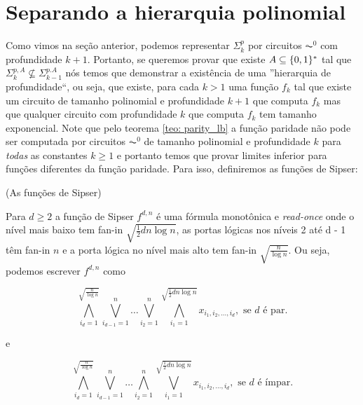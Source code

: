 \section{Separando a hierarquia polinomial}

Como vimos na seção anterior, podemos representar $\Sigma_{k}^{p}$ por circuitos $\AC^{0}$ com profundidade $k + 1$. Portanto, se queremos provar que existe $A \subseteq \{0, 1\}^{*}$ tal que $\Sigma_{k}^{p, A} \not\subseteq \Sigma_{k - 1}^{p. A}$ nós temos que demonstrar a existência de uma ''hierarquia de profundidade``, ou seja, que existe, para cada $k > 1$ uma função $f_{k}$ tal que existe um circuito de tamanho polinomial e profundidade $k + 1$ que computa $f_{k}$ mas que qualquer circuito com profundidade $k$ que computa $f_{k}$ tem tamanho exponencial. Note que pelo teorema \ref{teo: parity_lb} a função paridade não pode ser computada por circuitos $\AC^{0}$ de tamanho polinomial e profundidade $k$ para \emph{todas} as constantes $k \geq 1$ e portanto temos que provar limites inferior para funções diferentes da função paridade. Para isso, definiremos as funções de Sipser:

\begin{defi} (As funções de Sipser) \label{Sipser_f}

Para $d \geq 2$ a função de Sipser $f^{d, n}$ é uma fórmula monotônica e \emph{read-once} onde o nível mais baixo tem fan-in $\sqrt{\frac{1}{2}dn\log n}$, as portas lógicas nos níveis 2 até d - 1 têm fan-in $n$ e a porta lógica no nível mais alto tem fan-in $\sqrt{\frac{n}{\log n}}$. Ou seja, podemos escrever $f^{d, n}$ como

\begin{equation} \label{Sipser_f_def_1}
	\bigwedge_{i_{d}  = 1}^{\sqrt{\frac{n}{\log n}}}\bigvee_{i_{d - 1} = 1}^{n} \dots \bigvee_{i_{2} = 1}^{n} \bigwedge_{i_{1} = 1}^{\sqrt{\frac{1}{2}dn\log n}} x_{i_{1}, i_{2}, \dots, i_{d}}, \text{ se } d \text{ é par.}
\end{equation}

e

\begin{equation} \label{Sipser_f_def_2}
	\bigwedge_{i_{d}  = 1}^{\sqrt{\frac{n}{\log n}}}\bigvee_{i_{d - 1} = 1}^{n} \dots \bigwedge_{i_{2} = 1}^{n} \bigvee_{i_{1} = 1}^{\sqrt{\frac{1}{2}dn\log n}} x_{i_{1}, i_{2}, \dots, i_{d}}, \text{ se } d \text{ é ímpar.}
\end{equation}

\end{defi}

